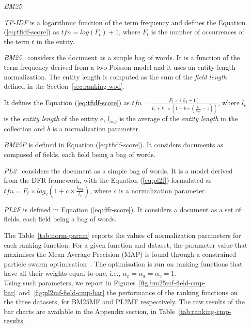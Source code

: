 \begin{labeling}{\emph{BM25~\cite{robertson:1994:sigir}}}
  \item[\emph{TF-IDF}] is a logarithmic function of the term frequency and defines the Equation (\ref{eq:tfidf-score}) as 
  $
  tfn=log(F_t)+1
  $,
  where $F_t$ is the number of occurrences of the term $t$ in the entity.
  \item[\emph{BM25~\cite{robertson:1994:sigir}}] considers the document as a simple bag of words. It is a function of the term frequency derived from a two-Poisson model and it uses an entity-length normalization. The entity length is computed as the sum of the \emph{field length} defined in the Section~\ref{sec:ranking-wod}.
  
  It defines the Equation (\ref{eq:tfidf-score}) as 
  $
  tfn=\frac{F_t\times(k_1+1)}{F_t+k_1\times \left(1+b\times\left(\frac{l_e}{l_{avg}}-1\right)\right)}
  $,
where $l_e$ is the \emph{entity length} of the entity $e$, $l_{avg}$ is the average of the \emph{entity length} in the collection and $b$ is a normalization parameter.
  \item[\emph{BM25F}] is defined in Equation (\ref{eq:tfidf-score}). It considers documents as composed of fields, each field being a bag of words.
  \item[\emph{PL2~\cite{amati:2002:acm}}] considers the document as a simple bag of words. It is a model derived from the DFR framework, with the Equation (\ref{eq:pl2f}) formulated as 
  $
  tfn=F_t\times log_2\left(1+c\times\frac{l_{avg}}{l_e}\right)
  $,
  where $c$ is a normalization parameter.
  \item[\emph{PL2F}] is defined in Equation (\ref{eq:dfr-score}). It considers a document as a set of fields, each field being a bag of words.
\end{labeling}

The Table~\ref{tab:norm-param} reports the values of normalization parameters for each ranking function. For a given function and dataset, the parameter value that maximises the Mean Average Precision (MAP) is found through a constrained particle swarm optimisation~\cite{xiaohui:2002:sci}. The optimisation is run on ranking functions that have all their weights equal to one, i.e., $\alpha_e = \alpha_a = \alpha_v = 1$.\\



Using such parameters, we report in Figures~\ref{fig:bm25mf-field-cmp-bar}~and~\ref{fig:pl2mf-field-cmp-bar} the performance of the ranking functions on the three datasets, for BM25MF and PL2MF respectively. The raw results of the bar charts are available in the Appendix section, in Table~\ref{tab:ranking-cmp-results}.

